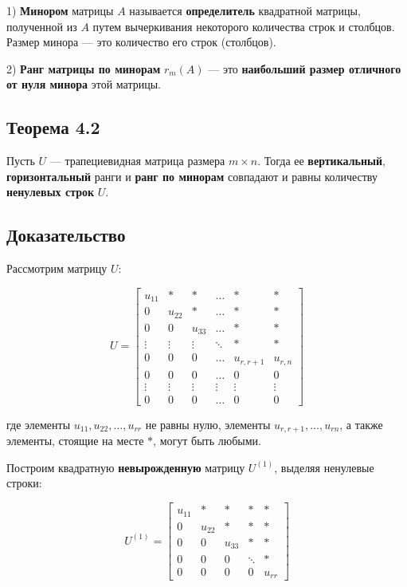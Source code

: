 {1) \textbf{Минором} матрицы \( A \) называется \textbf{определитель} квадратной матрицы, полученной из \( A \) путем вычеркивания некоторого количества строк и столбцов. Размер минора — это количество его строк (столбцов).

2) \textbf{Ранг матрицы по минорам} \( r_m(A) \) — это \textbf{наибольший размер отличного от нуля минора} этой матрицы.


\subsection*{Теорема 4.2}

Пусть \( U \) — трапециевидная матрица размера \( m \times n \). Тогда ее \textbf{вертикальный}, \textbf{горизонтальный} ранги и \textbf{ранг по минорам} совпадают и равны количеству \textbf{ненулевых строк} \( U \).

\subsection*{Доказательство}

Рассмотрим матрицу \( U \):



\[
U =
\begin{bmatrix}
u_{11} & * & * & \dots & * & * \\
0 & u_{22} & * & \dots & * & * \\
0 & 0 & u_{33} & \dots & * & * \\
\vdots & \vdots & \vdots & \ddots & * & * \\
0 & 0 & 0 & \dots & u_{r,r+1} & u_{r,n}  \\
0 & 0 & 0 & \dots & 0 & 0  \\
\vdots & \vdots & \vdots & \vdots & \vdots & \vdots \\
0 & 0 & 0 & \dots & 0 & 0
\end{bmatrix}
\]



где элементы \( u_{11}, u_{22}, \dots, u_{rr} \) не равны нулю, элементы \( u_{r,r+1}, \dots, u_{rn} \), а также элементы, стоящие на месте \(*\), могут быть любыми.

Построим квадратную \textbf{невырожденную} матрицу \( U^{(1)} \), выделяя ненулевые строки:



\[
U^{(1)} =
\begin{bmatrix}
u_{11} & * & * & * & * \\
0 & u_{22} & * & * & * \\
0 & 0 & u_{33} & * & * \\
0 & 0 & 0 & \ddots & * \\
0 & 0 & 0 & 0 & u_{rr}
\end{bmatrix}
\]



}
